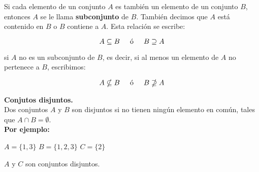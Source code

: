 \noindent Si cada elemento de un conjunto $A$ es también un elemento de un conjunto $B$, entonces $A$ se le llama \textbf{subconjunto} de $B$. También decimos que $A$ está contenido en $B$ o $B$ contiene a $A$. Esta relación se escribe:

    \begin{equation}
            A \subseteq B  \hspace{0.5cm} \text{\'o} \hspace{0.5cm} B \supseteq A
    \end{equation}

\noindent     si $A$ no es un subconjunto de $B$, es decir, si al menos un elemento de $A$ no pertenece a $B$, escribimos:

    \begin{equation}
            A \nsubseteq B  \hspace{0.5cm}  \text{\'o} \hspace{0.5cm} B \nsupseteq A
    \end{equation}


\noindent \textbf{Conjutos disjuntos.} \\
\noindent     Dos conjuntos $A$ y $B$ son disjuntos si no tienen ning\'un elemento en com\'un, tales que  $A \cap B = \emptyset$. \\
\noindent \textbf{Por ejemplo:}
    \begin{center}
         $A = \lbrace 1, 3\rbrace $\hspace{0.5cm}  $B = \lbrace 1, 2, 3\rbrace$  \hspace{0.5cm}  $C = \lbrace  2\rbrace$
    \end{center}
   
    $A$ y $C$ son conjuntos disjuntos.